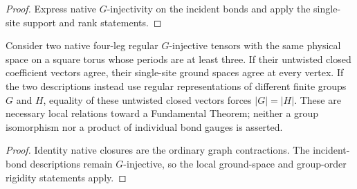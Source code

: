 \begin{proof}\leanok
    Express native $G$-injectivity on the incident bonds and
    apply the single-site support and rank statements.
\end{proof}

\begin{lemma}%
    \label{thm:peps_native_regular_closure_local_rigidity}
    \leanok
    Consider two native four-leg regular $G$-injective tensors with
    the same physical space on a square torus whose periods are at
    least three. If their untwisted closed coefficient vectors agree,
    their single-site ground spaces agree at every vertex. If the two
    descriptions instead use regular representations of different
    finite groups $G$ and $H$, equality of these untwisted closed
    vectors forces $|G|=|H|$.
    These are necessary local relations toward a Fundamental Theorem;
    neither a group isomorphism nor a product of individual bond
    gauges is asserted.
\end{lemma}

\begin{proof}\leanok
    Identity native closures are the ordinary graph contractions.
    The incident-bond descriptions remain $G$-injective, so the local
    ground-space and group-order rigidity statements apply.
\end{proof}
